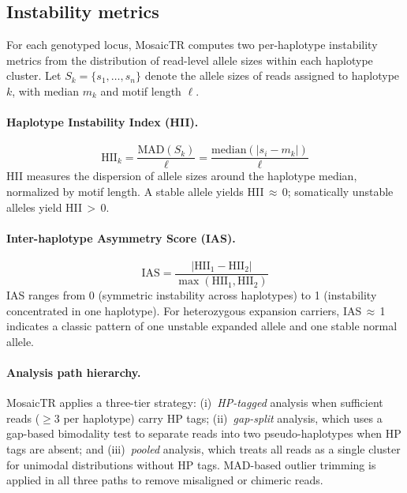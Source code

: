 \documentclass[12pt]{article}
\begin{document}
\subsection{Instability metrics}

For each genotyped locus, MosaicTR computes two per-haplotype instability metrics from the distribution of read-level allele sizes within each haplotype cluster.
Let $S_k = \{s_1, \ldots, s_n\}$ denote the allele sizes of reads assigned to haplotype $k$, with median $m_k$ and motif length $\ell$.

\paragraph{Haplotype Instability Index (HII).}
\begin{equation}
  \text{HII}_k = \frac{\text{MAD}(S_k)}{\ell} = \frac{\text{median}(|s_i - m_k|)}{\ell}
  \label{eq:hii}
\end{equation}
HII measures the dispersion of allele sizes around the haplotype median, normalized by motif length.
A stable allele yields HII\,$\approx$\,0; somatically unstable alleles yield HII\,$>$\,0.

\paragraph{Inter-haplotype Asymmetry Score (IAS).}
\begin{equation}
  \text{IAS} = \frac{|\text{HII}_1 - \text{HII}_2|}{\max(\text{HII}_1, \text{HII}_2)}
  \label{eq:ias}
\end{equation}
IAS ranges from 0 (symmetric instability across haplotypes) to 1 (instability concentrated in one haplotype).
For heterozygous expansion carriers, IAS\,$\approx$\,1 indicates a classic pattern of one unstable expanded allele and one stable normal allele.

\paragraph{Analysis path hierarchy.}
MosaicTR applies a three-tier strategy: (i)~\textit{HP-tagged} analysis when sufficient reads ($\geq$3 per haplotype) carry HP tags; (ii)~\textit{gap-split} analysis, which uses a gap-based bimodality test to separate reads into two pseudo-haplotypes when HP tags are absent; and (iii)~\textit{pooled} analysis, which treats all reads as a single cluster for unimodal distributions without HP tags.
MAD-based outlier trimming is applied in all three paths to remove misaligned or chimeric reads.
\end{document}
